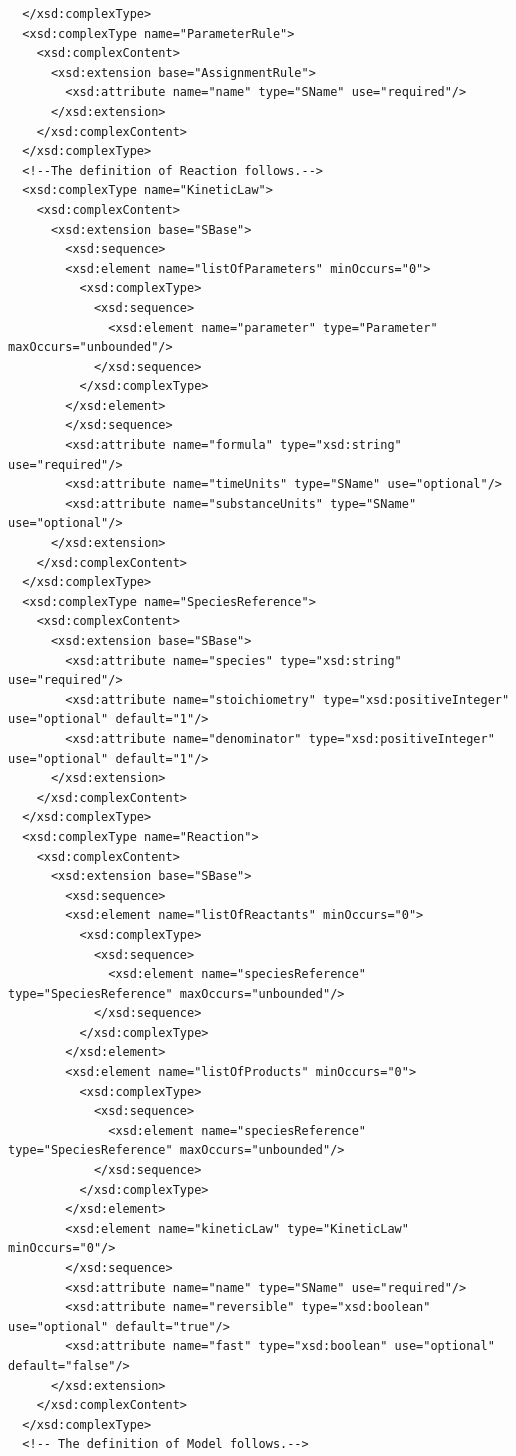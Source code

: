 \documentclass[10pt]{cekarticle}
\newenvironment{blockChanged}{\color{BrickRed}}{}
\begin{document}
\begin{blockChanged}
\begin{small}
\begin{verbatim}
  </xsd:complexType>
  <xsd:complexType name="ParameterRule">
    <xsd:complexContent>
      <xsd:extension base="AssignmentRule">
      	<xsd:attribute name="name" type="SName" use="required"/>
      </xsd:extension>
    </xsd:complexContent>
  </xsd:complexType>
  <!--The definition of Reaction follows.-->
  <xsd:complexType name="KineticLaw">
    <xsd:complexContent>
      <xsd:extension base="SBase">
      	<xsd:sequence>
        <xsd:element name="listOfParameters" minOccurs="0">
          <xsd:complexType>
            <xsd:sequence>
              <xsd:element name="parameter" type="Parameter" maxOccurs="unbounded"/>
            </xsd:sequence>
          </xsd:complexType>
        </xsd:element>
      	</xsd:sequence>
      	<xsd:attribute name="formula" type="xsd:string" use="required"/>
      	<xsd:attribute name="timeUnits" type="SName" use="optional"/>
      	<xsd:attribute name="substanceUnits" type="SName" use="optional"/>
      </xsd:extension>
    </xsd:complexContent>
  </xsd:complexType>
  <xsd:complexType name="SpeciesReference">
    <xsd:complexContent>
      <xsd:extension base="SBase">
      	<xsd:attribute name="species" type="xsd:string" use="required"/>
      	<xsd:attribute name="stoichiometry" type="xsd:positiveInteger" use="optional" default="1"/>
      	<xsd:attribute name="denominator" type="xsd:positiveInteger" use="optional" default="1"/>
      </xsd:extension>
    </xsd:complexContent>
  </xsd:complexType>
  <xsd:complexType name="Reaction">
    <xsd:complexContent>
      <xsd:extension base="SBase">
      	<xsd:sequence>
        <xsd:element name="listOfReactants" minOccurs="0">
          <xsd:complexType>
            <xsd:sequence>
              <xsd:element name="speciesReference" type="SpeciesReference" maxOccurs="unbounded"/>
            </xsd:sequence>
          </xsd:complexType>
        </xsd:element>
        <xsd:element name="listOfProducts" minOccurs="0">
          <xsd:complexType>
            <xsd:sequence>
              <xsd:element name="speciesReference" type="SpeciesReference" maxOccurs="unbounded"/>
            </xsd:sequence>
          </xsd:complexType>
        </xsd:element>
        <xsd:element name="kineticLaw" type="KineticLaw" minOccurs="0"/>
      	</xsd:sequence>
      	<xsd:attribute name="name" type="SName" use="required"/>
      	<xsd:attribute name="reversible" type="xsd:boolean" use="optional" default="true"/>
      	<xsd:attribute name="fast" type="xsd:boolean" use="optional" default="false"/>
      </xsd:extension>
    </xsd:complexContent>
  </xsd:complexType>
  <!-- The definition of Model follows.-->

\end{verbatim}
\end{small}
\end{blockChanged}
\end{document}

